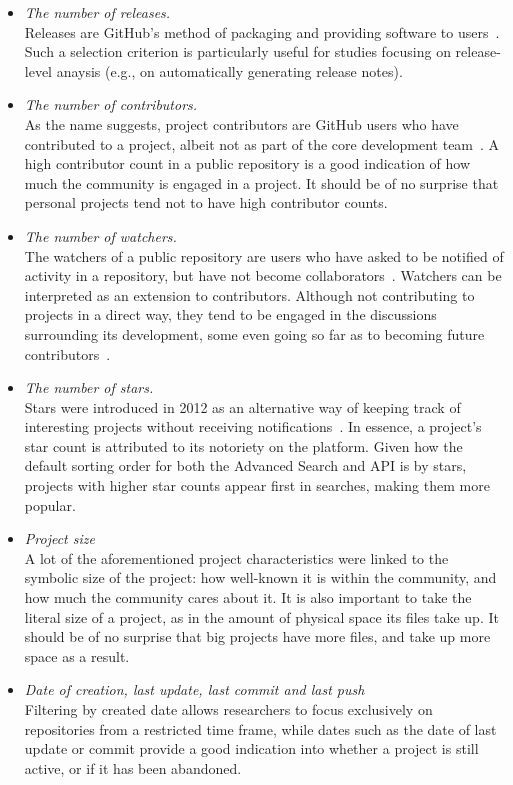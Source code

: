 \begin{itemize}
    \item \textit{The number of releases.}
    \\Releases are GitHub's method of packaging and providing software to users~\cite{GITHUBHELP}. Such a selection criterion is particularly useful for studies focusing on release-level anaysis (e.g., on automatically generating release notes). 
    \item \textit{The number of contributors.}
    \\As the name suggests, project contributors are GitHub users who have contributed to a project, albeit not as part of the core development team~\cite{GITHUBHELP}. A high contributor count in a public repository is a good indication of how much the community is engaged in a project. It should be of no surprise that personal projects tend not to have high contributor counts.
    \item \textit{The number of watchers.}
    \\The watchers of a public repository are users who have asked to be notified of activity in a repository, but have not become collaborators~\cite{METRICSWATCHERS}. Watchers can be interpreted as an extension to contributors. Although not contributing to projects in a direct way, they tend to be engaged in the discussions surrounding its development, some even going so far as to becoming future contributors~\cite{WATCHERS14}.
    \item \textit{The number of stars.}
    \\Stars were introduced in 2012 as an alternative way of keeping track of interesting projects without receiving notifications~\cite{STARS}. In essence, a project's star count is attributed to its notoriety on the platform. Given how the default sorting order for both the Advanced Search and API is by stars, projects with higher star counts appear first in searches, making them more popular.
    \item \textit{Project size}
    \\A lot of the aforementioned project characteristics were linked to the symbolic size of the project: how well-known it is within the community, and how much the community cares about it. It is also important to take the literal size of a project, as in the amount of physical space its files take up. It should be of no surprise that big projects have more files, and take up more space as a result.
    \item \textit{Date of creation, last update, last commit and last push}
    \\Filtering by created date allows researchers to focus exclusively on repositories from a restricted time frame, while dates such as the date of last update or commit provide a good indication into whether a project is still active, or if it has been abandoned.

\end{itemize}
